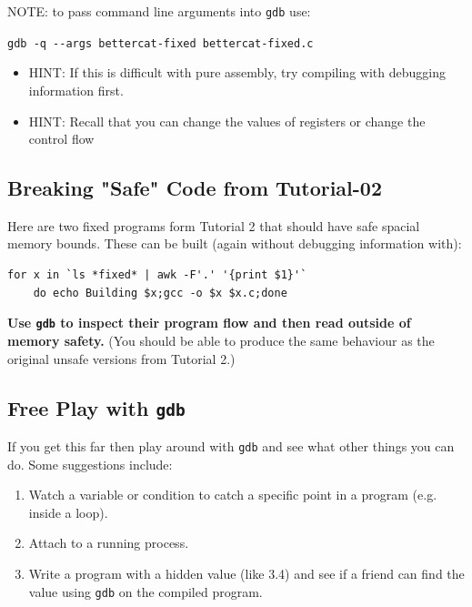 \documentclass{article}
\begin{document}
\noindent NOTE: to pass command line arguments into \lstinline{gdb} use:
\begin{center}
    \lstinline{gdb -q --args bettercat-fixed bettercat-fixed.c}
\end{center}
\begin{itemize}
    \item HINT: If this is difficult with pure assembly, try compiling with debugging information first.
    \item HINT: Recall that you can change the values of registers or change the control flow
\end{itemize}

\subsection{Breaking "Safe" Code from Tutorial-02}
Here are two fixed programs form Tutorial 2 that should have safe spacial
memory bounds. These can be built (again without debugging information
with):
\begin{lstlisting}[mathescape=false]
for x in `ls *fixed* | awk -F'.' '{print $1}'`
    do echo Building $x;gcc -o $x $x.c;done
\end{lstlisting}
\noindent \textbf{Use \lstinline{gdb} to inspect their program flow and then read outside of memory
safety.} (You should be able to produce the same behaviour as the original
unsafe versions from Tutorial 2.)
\subsection{Free Play with \lstinline{gdb}}
If you get this far then play around with \lstinline{gdb} and see what other things you
can do. Some suggestions include:
\begin{enumerate}
    \item Watch a variable or condition to catch a specific point in a program (e.g. inside a loop).
    \item Attach to a running process.
    \item Write a program with a hidden value (like 3.4) and see if a friend can find the value using \lstinline{gdb} on the compiled program.
\end{enumerate}

% 
% 
\end{document}
